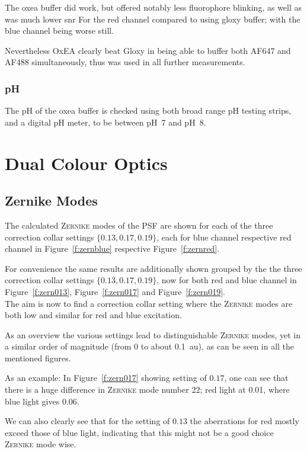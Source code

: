 \documentclass[11pt, a4paper, oneside, twocolumn]{report}
\newcommand{\x}[1]{#1\index{#1}}
\begin{document}
The \gls{oxea} buffer did work, but offered notably less
\x{fluorophore blinking}, as well as was much lower \gls{snr} For the
red channel compared to using \gls{gloxy} buffer; with the blue
channel being worse still.

Nevertheless OxEA clearly beat Gloxy in being able to buffer both
AF647 and AF488 simultaneously, thus was used in all further
measurements.


\subsubsection{pH}

The pH of the \gls{oxea} buffer is checked using both broad range pH
testing strips, and a digital pH meter, to be between pH~7 and pH~8.


\section{Dual Colour Optics}


\subsection{Zernike Modes}\label{s:r:zern}

The calculated \textsc{Zernike} modes of the PSF are shown for each of
the three correction collar settings $\{0.13,0.17,0.19\}$, each for
blue channel respective red channel in Figure~\ref{f:zernblue}
respective Figure~\ref{f:zernred}.

For convenience the same results are additionally shown grouped by the
the three correction collar settings $\{0.13,0.17,0.19\}$, now for
both red and blue channel in Figure~\ref{f:zern013},
Figure~\ref{f:zern017} and Figure~\ref{f:zern019}.\\

The aim is now to find a correction collar setting where the
\textsc{Zernike} modes are both low and similar for red and blue
excitation.

As an overview the various settings lead to distinguishable
\textsc{Zernike} modes, yet in a similar order of magnitude (from 0 to
about 0.1~au), as can be seen in all the mentioned figures.

As an example: In Figure~\ref{f:zern017} showing setting of $0.17$,
one can see that there is a huge difference in \textsc{Zernike} mode
number 22; red light at 0.01, where blue light gives 0.06.

We can also clearly see that for the setting of $0.13$ the aberrations
for red mostly exceed those of blue light, indicating that this might
not be a good choice \textsc{Zernike} mode wise.
\end{document}
